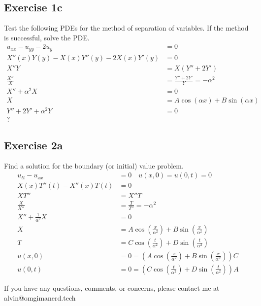 \documentclass{math}
\begin{document}
\subsection*{Exercise 1c}
Test the following PDEs for the method of separation of variables. If the
method is successful, solve the PDE.
\begin{align*}
  u_{xx}-u_{yy}-2u_y &= 0 \\
  X''(x)Y(y)-X(x)Y''(y)-2X(x)Y'(y) &= 0 \\
  X''Y &= X(Y''+2Y') \\
  \frac{X''}{X} &= \frac{Y''+2Y'}{Y} = -\alpha^2 \\
  X''+\alpha^2X &= 0 \\
  X &= A\cos(\alpha x)+B\sin(\alpha x) \\
  Y''+2Y'+\alpha^2Y &= 0 \\
  ?
\end{align*}

\subsection*{Exercise 2a}
Find a solution for the boundary (or initial) value problem.
\begin{align*}
  u_{tt}-u_{xx} &= 0 \quad u(x,0) = u(0,t) = 0 \\
  X(x)T''(t)-X''(x)T(t) &= 0 \\
  XT'' &= X''T \\
  \frac{X}{X''} &= \frac{T}{T''} = -\alpha^2 \\
  X''+\frac{1}{\alpha^2}X &= 0 \\
  X &= A\cos(\frac{x}{\alpha^2})+B\sin(\frac{x}{\alpha^2}) \\
  T &= C\cos(\frac{t}{\alpha^2})+D\sin(\frac{t}{\alpha^2}) \\
  u(x,0) &= 0 = (A\cos(\frac{x}{\alpha^2})+B\sin(\frac{x}{\alpha^2}))C \\
  u(0,t) &= 0 = (C\cos(\frac{t}{\alpha^2})+D\sin(\frac{t}{\alpha^2}))A
\end{align*}

\begin{center}
  If you have any questions, comments, or concerns, please contact me at
  alvin@omgimanerd.tech
\end{center}
\end{document}
